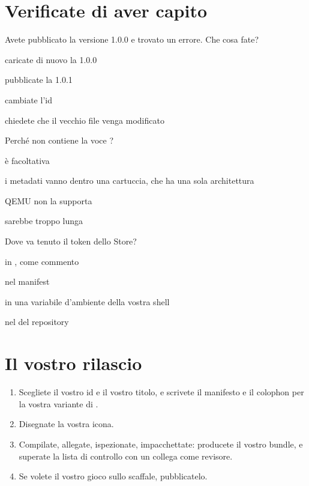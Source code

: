 

\section{Verificate di aver capito}

\begin{quiz}{Avete pubblicato la versione 1.0.0 e trovato un errore. Che cosa fate?}
\item caricate di nuovo la 1.0.0
\item pubblicate la 1.0.1
\item cambiate l'id
\item chiedete che il vecchio file venga modificato
\end{quiz}

\begin{quiz}{Perché  non contiene la voce ?}
\item è facoltativa
\item i metadati vanno dentro una cartuccia, che ha una sola architettura
\item QEMU non la supporta
\item sarebbe troppo lunga
\end{quiz}

\begin{quiz}{Dove va tenuto il token dello Store?}
\item in , come commento
\item nel manifest
\item in una variabile d'ambiente della vostra shell
\item nel  del repository
\end{quiz}

\section{Il vostro rilascio}

\begin{exercise}
\begin{enumerate}[nosep]
\item Scegliete il vostro id e il vostro titolo, e scrivete il manifesto e il
  colophon per la vostra variante di \vermone.
\item Disegnate la vostra icona.
\item Compilate, allegate, ispezionate, impacchettate: producete il vostro
  bundle, e superate la lista di controllo con un collega come revisore.
\item Se volete il vostro gioco sullo scaffale, pubblicatelo.
\end{enumerate}
\end{exercise}

